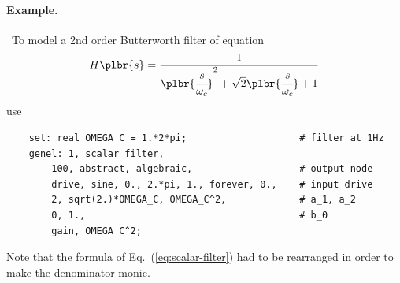 \paragraph{Example.} \
To model a 2nd order Butterworth filter of equation
\begin{equation}
	H\plbr{s} = \frac{
		1
	}{
		\plbr{\cfrac{s}{\omega_c}}^2
		+ \sqrt{2}\plbr{\cfrac{s}{\omega_c}}
		+ 1
	}
	\label{eq:scalar-filter}
\end{equation}
use
\begin{verbatim}
    set: real OMEGA_C = 1.*2*pi;                    # filter at 1Hz
    genel: 1, scalar filter,
        100, abstract, algebraic,                   # output node
        drive, sine, 0., 2.*pi, 1., forever, 0.,    # input drive
        2, sqrt(2.)*OMEGA_C, OMEGA_C^2,             # a_1, a_2
        0, 1.,                                      # b_0
        gain, OMEGA_C^2;
\end{verbatim}
Note that the formula of Eq.~(\ref{eq:scalar-filter})
had to be rearranged in order to make the denominator monic.




